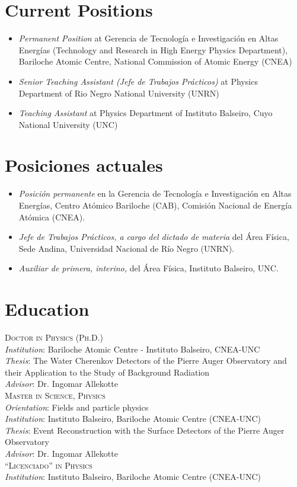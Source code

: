 \ifeng
\section*{Current Positions}
\begin{itemize}
\item \emph{Permanent Position} at Gerencia de Tecnología e Investigación en Altas Energías (Technology and Research in High Energy Physics Department), Bariloche Atomic Centre, National Commission of Atomic Energy (CNEA)
\item \emph{Senior Teaching Assistant (Jefe de Trabajos Prácticos)} at Physics Department of Rio Negro National University (UNRN)
\item \emph{Teaching Assistant} at Physics Department of Instituto Balseiro, Cuyo National University (UNC)
\end{itemize}
\else
\section*{Posiciones actuales}
\begin{itemize}
\item \emph{Posición permanente} en la Gerencia de Tecnología e Investigación en Altas Energías, Centro Atómico Bariloche (CAB), Comisión Nacional de Energía Atómica (CNEA).\\
\item \emph{Jefe de Trabajos Prácticos, a cargo del dictado de materia} del Área Física, Sede Andina, Universidad Nacional de Río Negro (UNRN).\\
\item \emph{Auxiliar de primera, interino,} del Área Física, Instituto Balseiro, UNC.\\
\end{itemize}
\fi

\ifeng
\section*{Education}
\noindent
{}\textsc{Doctor in Physics (Ph.D.)}\\
{\emph{Institution}}: Bariloche Atomic Centre - Instituto Balseiro, CNEA-UNC\\
{\emph{Thesis}}: The Water Cherenkov Detectors of the Pierre Auger Observatory and their Application to the Study of Background Radiation\\
{\emph{Advisor}}: Dr. Ingomar Allekotte\\
\textsc{Master in Science, Physics}\\
{\emph{Orientation}}: Fields and particle physics\\
{\emph{Institution}}: Instituto Balseiro, Bariloche Atomic Centre (CNEA-UNC)\\
{\emph{Thesis}}: Event Reconstruction with the Surface Detectors of the Pierre
Auger Observatory\\
{\emph{Advisor}}: Dr. Ingomar Allekotte\\ 
\textsc{``Licenciado'' in Physics}\\
{\emph{Institution}}: Instituto Balseiro, Bariloche Atomic Centre (CNEA-UNC)\\
\else
